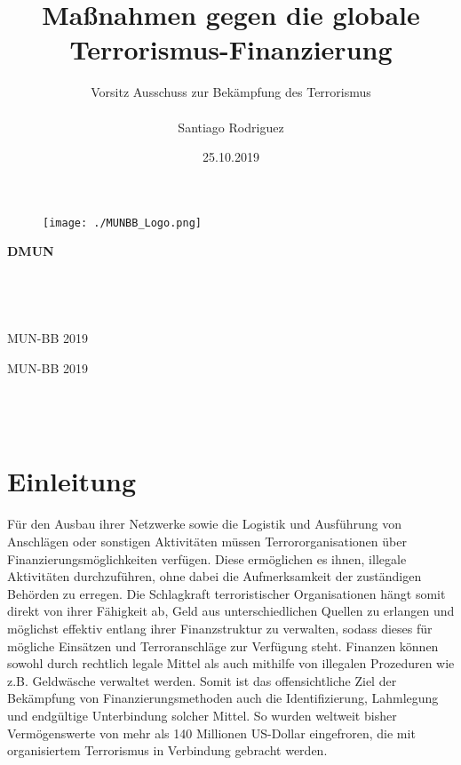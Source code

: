 \documentclass[a4paper,11pt]{article}
\title{Maßnahmen gegen die globale Terrorismus-Finanzierung}
\author{Vorsitz Ausschuss zur Bekämpfung des Terrorismus \\ \\ Santiago Rodriguez}
\date{25.10.2019}
\begin{document}
	\begin{titlepage}
		\thispagestyle{empty}
		\begin{figure}
			\texttt{[image: ./MUNBB\_Logo.png]}
		\end{figure}
		\vspace*{-43mm}\hspace{-6mm}\textbf{\textcolor{pantone294}{\large{DMUN}}}\\\\\\\\\\
		\textcolor{pantone294}{MUN-BB 2019}\\
		\vspace{30mm}
		\begin{center}
			\textcolor{pantone294}{\huge{MUN-BB 2019}}\\\vspace*{7mm}
			\textcolor{pantone294}{\huge{\textbf{\thetitle}}}\\\vspace*{10mm}
			\textcolor{pantone294}{\theauthor}\\\vspace*{10mm}
			\textcolor{pantone294}{\thedate}\\\vspace*{20mm}
		\end{center}
	\end{titlepage}
	\makeatother
	\restoregeometry
	\newpage
	
	\tableofcontents
\vspace{2cm}
	
	
	\section{Einleitung}
Für den Ausbau ihrer Netzwerke sowie die Logistik und Ausführung von Anschlägen oder sonstigen Aktivitäten müssen Terrororganisationen über Finanzierungsmöglichkeiten verfügen. Diese ermöglichen es ihnen, illegale Aktivitäten durchzuführen, ohne dabei die Aufmerksamkeit der zuständigen Behörden zu erregen. Die Schlagkraft terroristischer Organisationen hängt somit direkt von ihrer Fähigkeit ab, Geld aus unterschiedlichen Quellen zu erlangen und möglichst effektiv entlang ihrer Finanzstruktur zu verwalten, sodass dieses für mögliche Einsätzen und Terroranschläge zur Verfügung steht. Finanzen können sowohl durch rechtlich legale Mittel als auch mithilfe von illegalen Prozeduren wie z.B. Geldwäsche verwaltet werden. Somit ist das offensichtliche Ziel der Bekämpfung von Finanzierungsmethoden auch die Identifizierung, Lahmlegung und endgültige Unterbindung solcher Mittel. So wurden weltweit bisher Vermögenswerte von mehr als 140 Millionen US-Dollar eingefroren, die mit organisiertem Terrorismus in Verbindung gebracht werden. 
\end{document}
